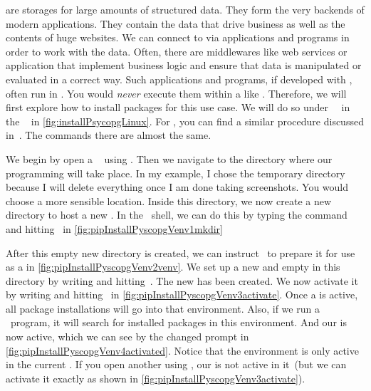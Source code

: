 %
 are storages for large amounts of structured data.
They form the very backends of modern applications.
They contain the data that drive business as well as the contents of huge websites.
We can connect to  via applications and programs in order to work with the data.
Often, there are middlewares like web services or application  that implement business logic and ensure that data is manipulated or evaluated in a correct way.
Such applications and programs, if developed with \python, often run in .
You would \emph{never} execute them within a  like \pycharm.%
%
%
%
Therefore, we will first explore how to install packages for this use case.
We will do so under \ubuntu\ \linux\ in the \bash\  in \cref{fig:installPsycopgLinux}.
For \microsoftWindows, you can find a similar procedure discussed in~\cite{programmingWithPython}.
The commands there are almost the same.

We begin by open a \bash\  using \ubuntuTerminal.
Then we navigate to the directory where our programming will take place.
In my example, I chose the temporary directory  because I will delete everything once I am done taking screenshots.
You would choose a more sensible location.
Inside this directory, we now create a new directory  to host a new .
In the \bash\ shell, we can do this by typing the command  and hitting~\keys{\enter} in \cref{fig:pipInstallPyscopgVenv1mkdir}

After this empty new directory is created, we can instruct \python\ to prepare it for use as a  in \cref{fig:pipInstallPyscopgVenv2venv}.
We set up a new and empty  in this directory by writing  and hitting~\keys{\enter}.
The new  has been created.
We now activate it by writing  and hitting~\keys{\enter} in \cref{fig:pipInstallPyscopgVenv3activate}.
Once a  is active, all package installations will go into that environment.
Also, if we run a \python\ program, it will search for installed packages in this environment.
And our   is now active, which we can see by the changed prompt in \cref{fig:pipInstallPyscopgVenv4activated}.
Notice that the environment is only active in the current .
If you open another  using \ubuntuTerminal, our  is not active in it~(but we can activate it exactly as shown in \cref{fig:pipInstallPyscopgVenv3activate}).

